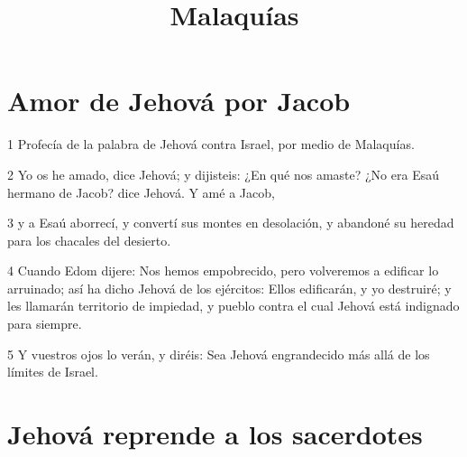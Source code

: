 

\title{Malaquías}

\section*{Amor de Jehová por Jacob}

\par 1 Profecía de la palabra de Jehová contra Israel, por medio de Malaquías.
\par 2 Yo os he amado, dice Jehová; y dijisteis: ¿En qué nos amaste? ¿No era Esaú hermano de Jacob? dice Jehová. Y amé a Jacob,
\par 3 y a Esaú aborrecí, y convertí sus montes en desolación, y abandoné su heredad para los chacales del desierto.
\par 4 Cuando Edom dijere: Nos hemos empobrecido, pero volveremos a edificar lo arruinado; así ha dicho Jehová de los ejércitos: Ellos edificarán, y yo destruiré; y les llamarán territorio de impiedad, y pueblo contra el cual Jehová está indignado para siempre.
\par 5 Y vuestros ojos lo verán, y diréis: Sea Jehová engrandecido más allá de los límites de Israel.

\section*{Jehová reprende a los sacerdotes}


